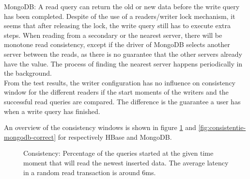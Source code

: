 \documentclass[10pt,conference,letterpaper]{IEEEtran}
\begin{document}
MongoDB: A read query can return the old or new data before the write query has been completed. Despite of the use of a readers/writer lock mechanism, it seems that after releasing the lock, the write query still has to execute extra steps. When reading from a secondary or the nearest server, there will be monotone read consistency, except if the driver of MongoDB selects another server between the reads, as there is no guarantee that the other servers already have the value. The process of finding the nearest server happens periodically in the background. \\
From the test results, the writer configuration has no influence on consistency window for the different readers if the start moments of the writers and the successful read queries are compared. The difference is the guarantee a user has when a write query has finished. 

An overview of the consistency windows is shown in figure \ref{fig:consistentie-hbase-correct} and \ref{fig:consistentie-mongodb-correct} for respectively HBase and MongoDB. 

\begin{figure}[!htf]

\caption{Consistency: Percentage of the queries started at the given time moment that will read the newest inserted data. The average latency in a random read transaction is around 6ms.}
\label{fig:consistentie-hbase-correct}
\end{figure}
\end{document}

